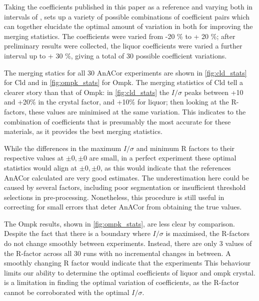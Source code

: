 Taking the coefficients published in this paper as a reference and varying both in intervals of , sets up a variety of possible combinations of coefficient pairs which can together elucidate the optimal amount of variation in both for improving the merging statistics. The coefficients were varied from -20 \% to + 20 \%; after preliminary results were collected, the liquor coefficients were varied a further interval up to + 30 \%, giving a total of 30 possible coefficient variations. %

The merging statics for all 30 AnACor experiments are shown in \cref{fig:cld_stats} for Cld and in \cref{fig:ompk_stats} for Ompk. The merging statistics of Cld tell a clearer story than that of Ompk: in \cref{fig:cld_stats} the $I/\sigma$ peaks between +10 and +20\% in the crystal factor, and +10\% for liquor; then looking at the R-factors, these values are minimised at the same variation. This indicates to the combination of coefficients that is presumably the most accurate for these materials, as it provides the best merging statistics.

While the differences in the maximum $I/\sigma$ and minimum R factors to their respective values at $\pm0,\pm0$ are small, in a perfect experiment these optimal statistics would align at $\pm0,\pm0$, as this would indicate that the references AnACor calculated are very good estimates. The underestimation here could be caused by several factors, including poor segmentation or insufficient threshold selections in pre-processing. Nonetheless, this procedure is still useful in correcting for small errors that deter AnACor from obtaining the true values. 

The Ompk results, shown in \cref{fig:ompk_stats}, are less clear by comparison. Despite the fact that there is a boundary where $I/\sigma$ is maximised, the R-factors do not change smoothly between experiments. Instead, there are only 3 values of the R-factor across all 30 runs with no incremental changes in between. A smoothly changing R factor would indicate that the experiments This behaviour limits our ability to determine the optimal coefficients of liquor and ompk crystal. is a limitation in finding the optimal variation of coefficients, as the R-factor cannot be corroborated with the optimal $I/\sigma$.



